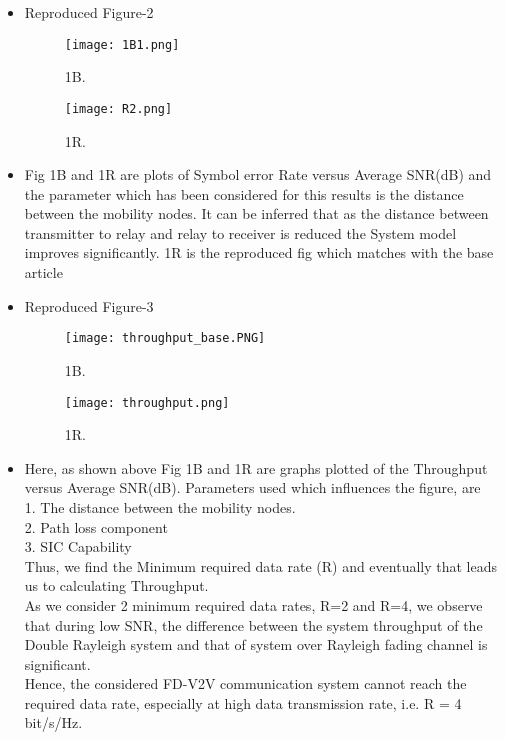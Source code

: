 \documentclass{article}
\begin{document}
\begin{itemize}
\item Reproduced Figure-2\\
\begin{figure}
  \begin{minipage}[b]{0.4\textwidth}
    \texttt{[image: 1B1.png]}
    \caption{1B.}
  \end{minipage}
  \hfill
  \begin{minipage}[b]{0.4\textwidth}
    \texttt{[image: R2.png]}
    \caption{1R.}
  \end{minipage}
  \end{figure}
  \item Fig 1B and 1R are plots of Symbol error Rate versus Average SNR(dB) and the parameter which has been considered for this results is the distance between the mobility nodes. It can be inferred that as the distance between transmitter to relay and relay to receiver is reduced the System model improves significantly. 1R is the reproduced fig which matches with the base article
\end{itemize}
\begin{itemize}
    \item Reproduced Figure-3
    \begin{figure}
  \begin{minipage}[b]{0.4\textwidth}
    \texttt{[image: throughput\_base.PNG]}
    \caption{1B.}
  \end{minipage}
  \hfill
  \begin{minipage}[b]{0.4\textwidth}
    \texttt{[image: throughput.png]}
    \caption{1R.}
  \end{minipage}
  \end{figure}
  \item Here, as shown above Fig 1B and 1R are graphs plotted of the Throughput versus Average SNR(dB). Parameters used which influences the figure, are
  \\1. The distance between the mobility nodes.
  \\2. Path loss component
  \\3. SIC Capability
  \\Thus, we find the Minimum required data rate (R) and eventually that leads us to calculating Throughput.
  \\As we consider 2 minimum required data rates, R=2 and R=4, we observe that during low SNR, the difference between the system throughput of the Double Rayleigh system and that of system over Rayleigh fading channel is significant.
\\Hence, the considered FD-V2V communication system cannot reach the required data rate, especially at high data transmission rate, i.e. R = 4 bit/s/Hz.
\end{itemize}
\end{document}
